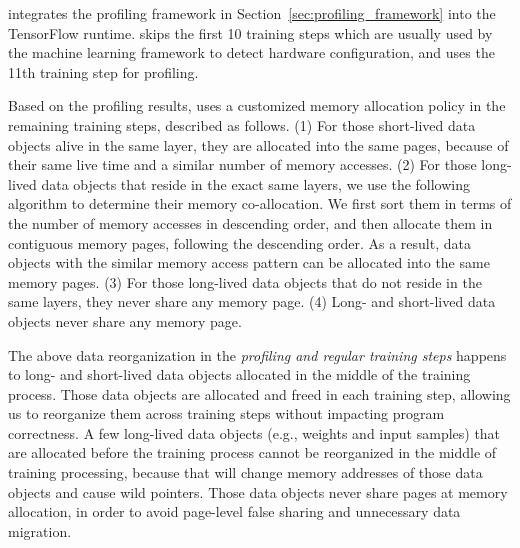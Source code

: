 \name integrates the profiling framework in Section~\ref{sec:profiling_framework} into the TensorFlow runtime. \textcolor{check}{\name skips the first 10 training steps which are usually used by the machine learning framework to detect hardware configuration, and uses the 11th training step for profiling.}


\textcolor{check}{Based on the profiling results, \name uses a customized memory allocation policy in the remaining training steps, described as follows. (1) For those short-lived data objects alive in the same layer, they are allocated into the same pages, because of their same live time and a similar number of memory accesses. (2) For those long-lived data objects that reside in the exact same layers, we use the following algorithm to determine their memory co-allocation. We first sort them in terms of the number of memory accesses in descending order, and then allocate them in contiguous memory pages, following the descending order. As a result, data objects with %
\textcolor{check}{the similar memory access pattern} %
can be allocated into the same memory pages. (3) For those long-lived data objects that do not reside in the same layers, they never share any memory page. (4) Long- and short-lived data objects never share any memory page. 
}


\textcolor{check}{
The above data reorganization in the \textit{profiling and regular training steps} happens to long- and short-lived data objects allocated in the middle of the training process.  Those data objects are allocated and freed in each training step, allowing us to reorganize them across training steps without impacting program correctness. A few long-lived data objects (e.g., weights and input samples) that are allocated before the training process cannot be reorganized in the middle of training processing, because that will change memory addresses of those data objects and cause wild pointers. Those data objects never share pages at memory allocation, in order to avoid page-level false sharing and unnecessary data migration. 
}


